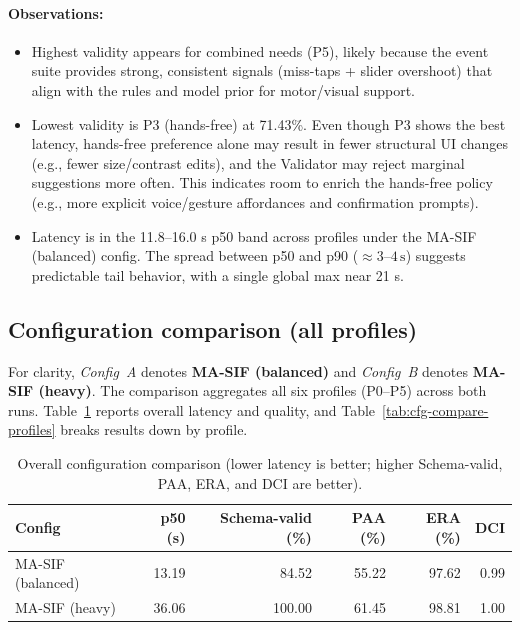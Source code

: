 \documentclass[openany]{book}
\begin{document}
\paragraph{Observations:}
\begin{itemize}
    \item Highest validity appears for combined needs (P5), likely because the event suite provides strong, consistent signals (miss-taps + slider overshoot) that align with the rules and model prior for motor/visual support.
    \item Lowest validity is P3 (hands-free) at 71.43\%. Even though P3 shows the best latency, hands-free preference alone may result in fewer structural UI changes (e.g., fewer size/contrast edits), and the Validator may reject marginal suggestions more often. This indicates room to enrich the hands-free policy (e.g., more explicit voice/gesture affordances and confirmation prompts).
    \item Latency is in the 11.8--16.0 s p50 band across profiles under the MA-SIF (balanced) config. The spread between p50 and p90 ($\approx 3$--$4\,\mathrm{s}$) suggests predictable tail behavior, with a single global max near 21 s.
\end{itemize}

\subsection{Configuration comparison (all profiles)}
For clarity, \emph{Config~A} denotes \textbf{MA-SIF (balanced)} and \emph{Config~B} denotes \textbf{MA-SIF (heavy)}. The comparison aggregates all six profiles (P0–P5) across both runs. Table~\ref{tab:cfg-compare-overall} reports overall latency and quality, and Table~\ref{tab:cfg-compare-profiles} breaks results down by profile.

\begin{table}[ht]
\centering
\caption{Overall configuration comparison (lower latency is better; higher Schema-valid, PAA, ERA, and DCI are better).}
\label{tab:cfg-compare-overall}
\begin{tabular}{lrrrrr}
\toprule
\textbf{Config} & \textbf{p50 (s)} & \textbf{Schema-valid (\%)} & \textbf{PAA (\%)} & \textbf{ERA (\%)} & \textbf{DCI} \\
\midrule
MA-SIF (balanced) & 13.19 & 84.52 & 55.22 & 97.62 & 0.99 \\
MA-SIF (heavy)    & 36.06 & 100.00 & 61.45 & 98.81 & 1.00 \\
\bottomrule
\end{tabular}
\end{table}
\end{document}
